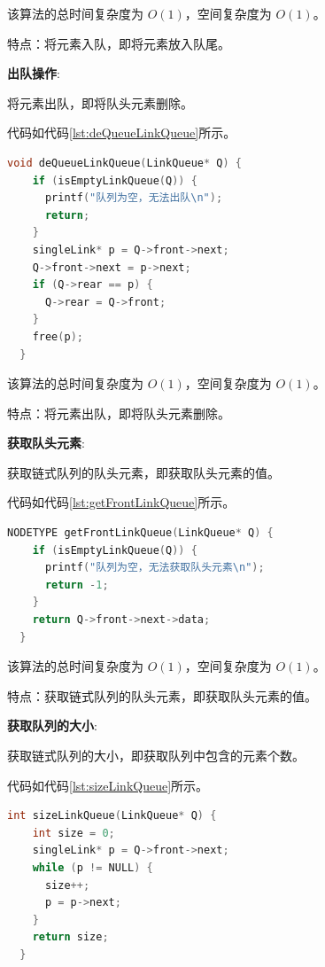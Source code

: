 \documentclass[lang=cn,newtx,10pt,scheme=chinese]{elegantbook}
\begin{document}
该算法的总时间复杂度为 $O(1)$，空间复杂度为 $O(1)$。

特点：将元素入队，即将元素放入队尾。

\textbf{出队操作}:

将元素出队，即将队头元素删除。

代码如代码\ref{lst:deQueueLinkQueue}所示。

\begin{lstlisting}[language=C++, caption={出队示例代码}, label={lst:deQueueLinkQueue}]
  void deQueueLinkQueue(LinkQueue* Q) {
    if (isEmptyLinkQueue(Q)) {
      printf("队列为空，无法出队\n");
      return;
    }
    singleLink* p = Q->front->next;
    Q->front->next = p->next;
    if (Q->rear == p) {
      Q->rear = Q->front;
    }
    free(p);
  }

\end{lstlisting}

该算法的总时间复杂度为 $O(1)$，空间复杂度为 $O(1)$。

特点：将元素出队，即将队头元素删除。

\textbf{获取队头元素}:

获取链式队列的队头元素，即获取队头元素的值。

代码如代码\ref{lst:getFrontLinkQueue}所示。

\begin{lstlisting}[language=C++, caption={获取队头元素示例代码}, label={lst:getFrontLinkQueue}]
  NODETYPE getFrontLinkQueue(LinkQueue* Q) {
    if (isEmptyLinkQueue(Q)) {
      printf("队列为空，无法获取队头元素\n");
      return -1;
    }
    return Q->front->next->data;
  }

\end{lstlisting}

该算法的总时间复杂度为 $O(1)$，空间复杂度为 $O(1)$。

特点：获取链式队列的队头元素，即获取队头元素的值。

\textbf{获取队列的大小}:

获取链式队列的大小，即获取队列中包含的元素个数。

代码如代码\ref{lst:sizeLinkQueue}所示。

\begin{lstlisting}[language=C++, caption={获取队列的大小示例代码}, label={lst:sizeLinkQueue}]
  int sizeLinkQueue(LinkQueue* Q) {
    int size = 0;
    singleLink* p = Q->front->next;
    while (p != NULL) {
      size++;
      p = p->next;
    }
    return size;
  }

\end{lstlisting}
\end{document}
